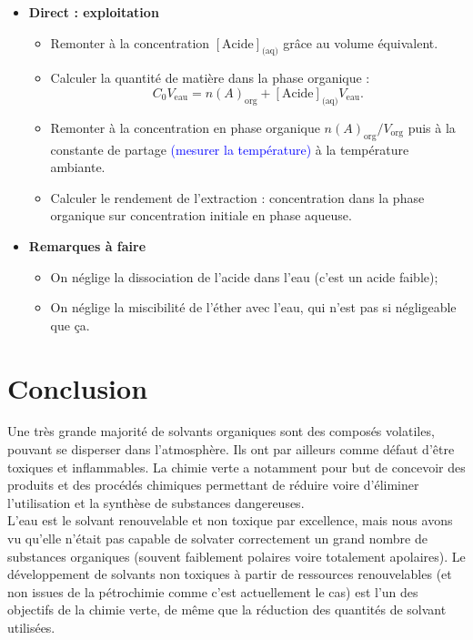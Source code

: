 \documentclass[11pt,a4paper]{report}
\begin{document}
\begin{itemize}
	\item \textbf{Direct : exploitation}
	\begin{itemize}
		\item Remonter à la concentration $[\text{Acide}]_\text{(aq)}$ grâce au volume équivalent.
		\item Calculer la quantité de matière dans la phase organique :
			\begin{equation}
				C_0 V_\text{eau} = n(A)_\text{org} + [\text{Acide}]_\text{(aq)} V_\text{eau}. 
			\end{equation}
		\item Remonter à la concentration en phase organique $n(A)_\text{org}/V_\text{org}$ puis à la 					constante de partage \textcolor{blue}{(mesurer la température)} à la température 						ambiante.
		\item Calculer le rendement de l'extraction : concentration dans la phase organique sur 						concentration initiale en phase aqueuse.
	\end{itemize}
	
	\item \textbf{Remarques à faire}
	\begin{itemize}
		\item On néglige la dissociation de l'acide dans l'eau (c'est un acide faible);
		\item On néglige la miscibilité de l'éther avec l'eau, qui n'est pas si négligeable que ça.
	\end{itemize}
\end{itemize}

\newpage
\section*{Conclusion}

Une très grande majorité de solvants organiques sont des composés volatiles, pouvant se disperser dans l'atmosphère. Ils ont par ailleurs comme défaut d'être toxiques et inflammables. La chimie verte a notamment pour but de concevoir des produits et des procédés chimiques permettant de réduire voire d'éliminer l'utilisation et la synthèse de substances dangereuses.\\

L'eau est le solvant renouvelable et non toxique par excellence, mais nous avons vu qu'elle n'était pas capable de solvater correctement un grand nombre de substances organiques (souvent faiblement polaires voire totalement apolaires). Le développement de solvants non toxiques à partir de ressources renouvelables (et non issues de la pétrochimie comme c'est actuellement le cas) est l'un des objectifs de la chimie verte, de même que la réduction des quantités de solvant utilisées.\\
\end{document}
